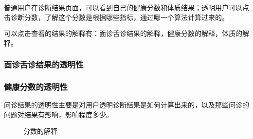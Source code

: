 普通用户在诊断结果页面，可以看到自己的健康分数和体质结果；透明用户可以点击诊断分数，了解这个分数是根据哪些指标，通过哪一个算法计算过来的。

可以点击查看的结果的解释有：面诊舌诊结果的解释，健康分数的解释，体质的解释。

\subsubsection{面诊舌诊结果的透明性}

\subsubsection{健康分数的透明性}
问诊结果的透明性主要是对用户透明诊断结果是如何计算出来的，以及那些问诊的问题对结果有影响，影响程度多少。

\begin{figure}[h]
    \centering
    \caption{分数的解释}
    \label{fig:report_expalin_score}
\end{figure}

